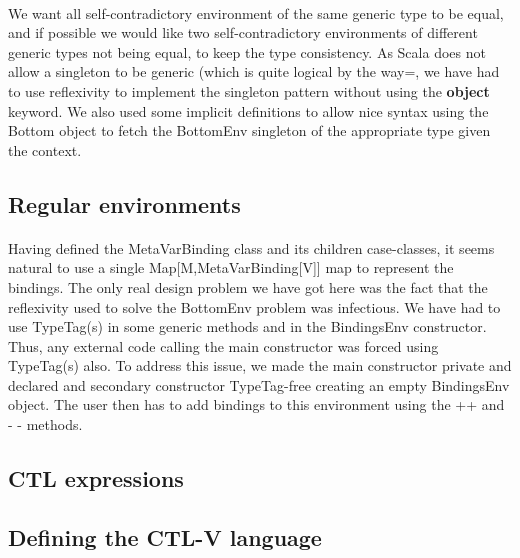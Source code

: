 \documentclass{report}
\begin{document}
\paragraph{}
\hspace{4mm}We want all self-contradictory environment of the same generic type to be equal, and if possible we would like two self-contradictory environments of
different generic types not being equal, to keep the type consistency. As Scala does not allow a singleton to be generic (which is quite logical by the way=,
we have had to use reflexivity to implement the singleton pattern without using the \textbf{object} keyword. We also used some implicit definitions to allow nice syntax using 
the Bottom object to fetch the BottomEnv singleton of the appropriate type given the context.

\subsection* {Regular environments}
\paragraph{}
\hspace{4mm}Having defined the MetaVarBinding class and its children case-classes, it seems natural to use a single Map[M,MetaVarBinding[V]] map to
represent the bindings. The only real design problem we have got here was the fact that the reflexivity used to solve the BottomEnv problem
was infectious. We have had to use TypeTag(s) in some generic methods and in the BindingsEnv constructor. Thus, any external code
calling the main constructor was forced using TypeTag(s) also. To address this issue, we made the main constructor private and declared and secondary constructor
TypeTag-free creating an empty BindingsEnv object. The user then has to add bindings to this environment using the ++ and - - methods.

\subsection{CTL expressions}

\subsection* {Defining the CTL-V language}
\end{document}
